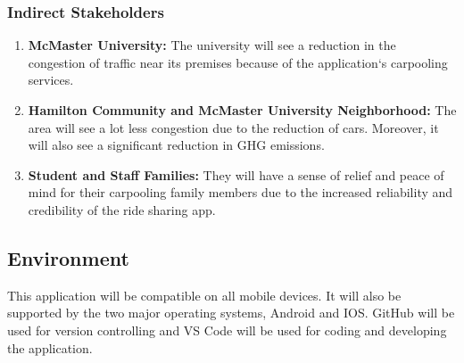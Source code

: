 \documentclass{article}
\begin{document}
\subsubsection{Indirect Stakeholders}
\begin{enumerate}
\item \textbf{McMaster University:} The university will see a reduction in the congestion of traffic near its premises because of the application`s carpooling services.
\item \textbf{Hamilton Community and McMaster University Neighborhood:} The area will see a lot less congestion due to the reduction of cars. Moreover, it will also see a significant reduction in GHG emissions.  
\item \textbf{Student and Staff Families:} They will have a sense of relief and peace of mind for their carpooling family members due to the increased reliability and credibility of the ride sharing app. 
\end{enumerate}

\subsection{Environment}
This application will be compatible on all mobile devices. It will also be supported by the two major operating systems, Android and IOS. GitHub will be used for version controlling and VS Code will be used for coding and developing the application.
\end{document}
